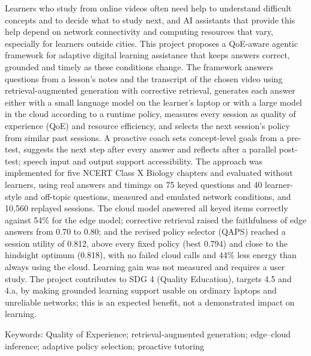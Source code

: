 Learners who study from online videos often need help to understand difficult concepts and to decide what
to study next, and AI assistants that provide this help depend on network connectivity and computing
resources that vary, especially for learners outside cities. This project proposes a QoE-aware agentic
framework for adaptive digital learning assistance that keeps answers correct, grounded and timely as
these conditions change. The framework answers questions from a lesson's notes and the transcript of the
chosen video using retrieval-augmented generation with corrective retrieval, generates each answer either
with a small language model on the learner's laptop or with a large model in the cloud according to a
runtime policy, measures every session as quality of experience (QoE) and resource efficiency, and selects
the next session's policy from similar past sessions. A proactive coach sets concept-level goals from a
pre-test, suggests the next step after every answer and reflects after a parallel post-test; speech input
and output support accessibility. The approach was implemented for five NCERT Class X Biology chapters and
evaluated without learners, using real answers and timings on 75 keyed questions and 40 learner-style and
off-topic questions, measured and emulated network conditions, and 10,560 replayed sessions. The cloud model
answered all keyed items correctly against 54\% for the edge model; corrective retrieval raised the
faithfulness of edge answers from 0.70 to 0.80; and the revised policy selector (QAPS) reached a session
utility of 0.812, above every fixed policy (best 0.794) and close to the hindsight optimum (0.818), with no
failed cloud calls and 44\% less energy than always using the cloud. Learning gain was not measured and
requires a user study. The project contributes to SDG 4 (Quality Education), targets 4.5 and 4.a, by
making grounded learning support usable on ordinary laptops and unreliable networks; this is an expected
benefit, not a demonstrated impact on learning.

Keywords: Quality of Experience; retrieval-augmented generation; edge--cloud inference; adaptive policy
selection; proactive tutoring
